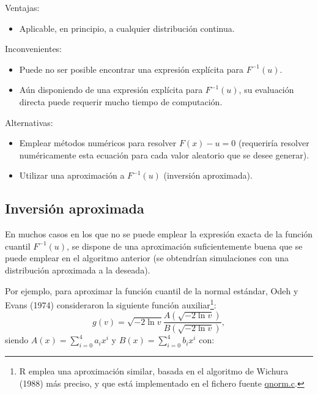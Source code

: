 \documentclass[
]{book}
\providecommand{\tightlist}{%
  \setlength{\itemsep}{0pt}\setlength{\parskip}{0pt}}
\theoremstyle{break}
\theoremstyle{definition}
\theoremstyle{definition}
\theoremstyle{definition}
\theoremstyle{definition}
\theoremstyle{remark}
\begin{document}
Ventajas:

\begin{itemize}
\tightlist
\item
  Aplicable, en principio, a cualquier distribución continua.
\end{itemize}

Inconvenientes:

\begin{itemize}
\item
  Puede no ser posible encontrar una expresión explícita para
  \(F^{-1}\left( u\right).\)
\item
  Aún disponiendo de una expresión explícita para
  \(F^{-1}\left( u\right)\), su evaluación directa puede requerir
  mucho tiempo de computación.
\end{itemize}

Alternativas:

\begin{itemize}
\item
  Emplear métodos numéricos para resolver \(F(x) - u=0\)
  (requeriría resolver numéricamente esta ecuación para cada
  valor aleatorio que se desee generar).
\item
  Utilizar una aproximación a \(F^{-1}\left( u\right)\)
  (inversión aproximada).
\end{itemize}

\hypertarget{inversiuxf3n-aproximada}{%
\subsection{Inversión aproximada}\label{inversiuxf3n-aproximada}}

En muchos casos en los que no se puede emplear la expresión exacta de la función
cuantil \(F^{-1}\left( u\right)\), se dispone de una aproximación suficientemente
buena que se puede emplear en el algoritmo anterior (se obtendrían simulaciones
con una distribución aproximada a la deseada).

Por ejemplo, para aproximar la función cuantil de la normal estándar,
Odeh y Evans (1974) consideraron la siguiente función auxiliar\footnote{R emplea una aproximación similar, basada en el algoritmo de Wichura (1988) más preciso, y que está implementado en el fichero fuente \href{https://svn.r-project.org/R/trunk/src/nmath/qnorm.c}{qnorm.c}.}:
\[ g\left( v\right)  =\sqrt{-2\ln v}\frac{A\left( \sqrt{-2\ln v}\right)
}{B\left( \sqrt{-2\ln v}\right)  },\]
siendo \(A(x) =\sum_{i=0}^{4}a_{i}x^{i}\)
y \(B(x) =\sum_{i=0}^{4}b_{i}x^{i}\) con:
\end{document}
